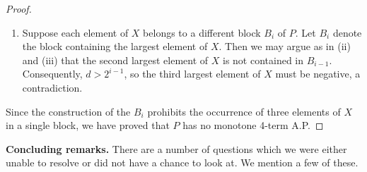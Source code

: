 \documentclass[10pt]{article}
\begin{document}
\begin{proof}
\begin{enumerate}[label=(\roman*),leftmargin=2.3em]
\item Suppose each element of $X$ belongs to a different block $B_i$ of
$P$. Let $B_i$ denote the block containing the largest element of $X$.
Then we may argue as in (ii) and (iii) that the second largest element of
$X$ is not contained in $B_{i-1}$. Consequently, $d>2^{i-1}$, so the
third largest element of $X$ must be negative, a contradiction.
\end{enumerate}
Since the construction of the $B_i$ prohibits the occurrence of three
elements of $X$ in a single block, we have proved that $P$ has no
monotone 4-term A.P.
\end{proof}

\medskip
\noindent\textbf{Concluding remarks.}
There are a number of questions which we were either unable to resolve or
did not have a chance to look at. We mention a few of these.
\end{document}
